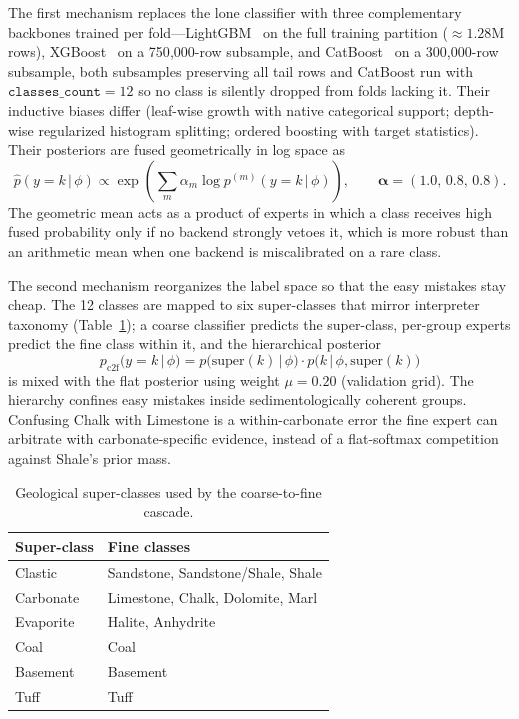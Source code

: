\documentclass[bdcc,article,submit,pdftex,moreauthors]{Definitions/mdpi}
\begin{document}
The first mechanism replaces the lone classifier with three complementary backbones trained
per fold---LightGBM~\cite{ke2017lightgbm} on the full training partition ($\approx\!1.28$M rows),
XGBoost~\cite{chen2016xgboost} on a 750{,}000-row subsample, and
CatBoost~\cite{prokhorenkova2018catboost} on a 300{,}000-row subsample, both subsamples
preserving all tail rows and CatBoost run with $\texttt{classes\_count}=12$ so no class is
silently dropped from folds lacking it. Their inductive biases differ (leaf-wise growth with
native categorical support; depth-wise regularized histogram splitting; ordered boosting with
target statistics). Their posteriors are fused geometrically in log space as
\begin{equation}
\hat p(y=k\,|\,\phi)\propto\exp\!\left(\sum_m \alpha_m\log p^{(m)}(y=k\,|\,\phi)\right),\qquad
\boldsymbol\alpha=(1.0,\,0.8,\,0.8).
\label{eq:geomean}
\end{equation}
The geometric mean acts as a product of experts in which a class receives high fused probability only
if no backend strongly vetoes it, which is more robust than an arithmetic mean when one
backend is miscalibrated on a rare class.

The second mechanism reorganizes the label space so that the easy mistakes stay cheap. The 12
classes are mapped to six super-classes that mirror interpreter taxonomy
(Table~\ref{tab:superclass}); a coarse classifier predicts the super-class, per-group experts
predict the fine class within it, and the hierarchical posterior
\begin{equation}
p_\text{c2f}(y=k\,|\,\phi) = p\!\bigl(\text{super}(k)\,|\,\phi\bigr)\cdot p\!\bigl(k\,|\,\phi,\text{super}(k)\bigr)
\label{eq:c2f}
\end{equation}
is mixed with the flat posterior using weight $\mu=0.20$ (validation grid). The hierarchy
confines easy mistakes inside sedimentologically coherent groups. Confusing Chalk with
Limestone is a within-carbonate error the fine expert can arbitrate with carbonate-specific
evidence, instead of a flat-softmax competition against Shale's prior mass.

\begin{table}[H]
\caption{Geological super-classes used by the coarse-to-fine cascade.\label{tab:superclass}}
\begin{tabularx}{\textwidth}{lX}
\toprule
\textbf{Super-class} & \textbf{Fine classes}\\
\midrule
Clastic & Sandstone, Sandstone/Shale, Shale\\
Carbonate & Limestone, Chalk, Dolomite, Marl\\
Evaporite & Halite, Anhydrite\\
Coal & Coal\\
Basement & Basement\\
Tuff & Tuff\\
\bottomrule
\end{tabularx}
\end{table}
\end{document}
